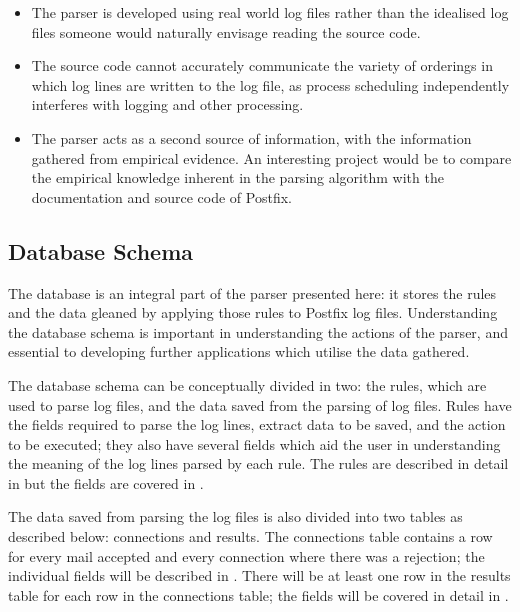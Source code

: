 \begin{itemize}

    \item The parser is developed using real world log files rather than
        the idealised log files someone would naturally envisage reading
        the source code.

    \item The source code cannot accurately communicate the variety of
        orderings in which log lines are written to the log file, as
        process scheduling independently interferes with logging and other
        processing.

    \item The parser acts as a second source of information, with the
        information gathered from empirical evidence.  An interesting
        project would be to compare the empirical knowledge inherent in the
        parsing algorithm with the documentation and source code of
        Postfix.

\end{itemize}



\subsection{Database Schema}
\label{database schema}

The database is an integral part of the parser presented here: it stores
the rules and the data gleaned by applying those rules to Postfix log
files.  Understanding the database schema is important in understanding the
actions of the parser, and essential to developing further applications
which utilise the data gathered.

The database schema can be conceptually divided in two: the rules, which
are used to parse log files, and the data saved from the parsing of log
files.  Rules have the fields required to parse the log lines, extract data
to be saved, and the action to be executed; they also have several fields
which aid the user in understanding the meaning of the log lines parsed by
each rule.  The rules are described in detail in  but the
fields are covered in .

The data saved from parsing the log files is also divided into two tables
as described below: connections and results.  The connections table
contains a row for every mail accepted and every connection where there was
a rejection; the individual fields will be described in
.  There will be at least one row in the
results table for each row in the connections table; the fields will be
covered in detail in .

